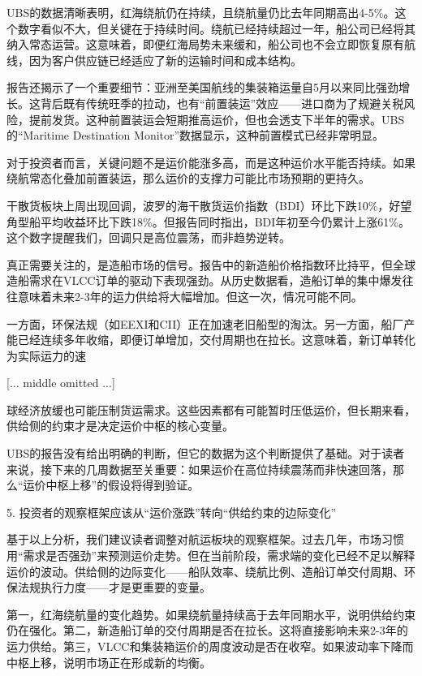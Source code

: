 \documentclass[11pt]{ctexart}
\begin{document}
UBS的数据清晰表明，红海绕航仍在持续，且绕航量仍比去年同期高出4-5\%。这个数字看似不大，但关键在于持续时间。绕航已经持续超过一年，船公司已经将其纳入常态运营。这意味着，即便红海局势未来缓和，船公司也不会立即恢复原有航线，因为客户供应链已经适应了新的运输时间和成本结构。

报告还揭示了一个重要细节：亚洲至美国航线的集装箱运量自5月以来同比强劲增长。这背后既有传统旺季的拉动，也有“前置装运”效应——进口商为了规避关税风险，提前发货。这种前置装运会短期推高运价，但也会透支下半年的需求。UBS的“Maritime Destination Monitor”数据显示，这种前置模式已经非常明显。

对于投资者而言，关键问题不是运价能涨多高，而是这种运价水平能否持续。如果绕航常态化叠加前置装运，那么运价的支撑力可能比市场预期的更持久。

干散货板块上周出现回调，波罗的海干散货运价指数（BDI）环比下跌10\%，好望角型船平均收益环比下跌18\%。但报告同时指出，BDI年初至今仍累计上涨61\%。这个数字提醒我们，回调只是高位震荡，而非趋势逆转。

真正需要关注的，是造船市场的信号。报告中的新造船价格指数环比持平，但全球造船需求在VLCC订单的驱动下表现强劲。从历史数据看，造船订单的集中爆发往往意味着未来2-3年的运力供给将大幅增加。但这一次，情况可能不同。

一方面，环保法规（如EEXI和CII）正在加速老旧船型的淘汰。另一方面，船厂产能已经连续多年收缩，即便订单增加，交付周期也在拉长。这意味着，新订单转化为实际运力的速

[... middle omitted ...]

球经济放缓也可能压制货运需求。这些因素都有可能暂时压低运价，但长期来看，供给侧的约束才是决定运价中枢的核心变量。

UBS的报告没有给出明确的判断，但它的数据为这个判断提供了基础。对于读者来说，接下来的几周数据至关重要：如果运价在高位持续震荡而非快速回落，那么“运价中枢上移”的假设将得到验证。

5. 投资者的观察框架应该从“运价涨跌”转向“供给约束的边际变化”

基于以上分析，我们建议读者调整对航运板块的观察框架。过去几年，市场习惯用“需求是否强劲”来预测运价走势。但在当前阶段，需求端的变化已经不足以解释运价的波动。供给侧的边际变化——船队效率、绕航比例、造船订单交付周期、环保法规执行力度——才是更重要的变量。

第一，红海绕航量的变化趋势。如果绕航量持续高于去年同期水平，说明供给约束仍在强化。第二，新造船订单的交付周期是否在拉长。这将直接影响未来2-3年的运力供给。第三，VLCC和集装箱运价的周度波动是否在收窄。如果波动率下降而中枢上移，说明市场正在形成新的均衡。
\end{document}
